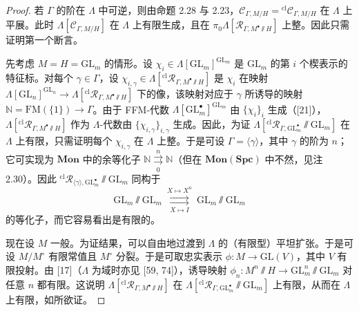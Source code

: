 \begin{proof}
若 $\Gamma$ 的阶在 $\Lambda$ 中可逆，则由命题 2.28 与 2.23，$\mathcal C_{\Gamma,M/H} = {}^{\mathrm{cl}}\mathcal C_{\Gamma,M/H}$ 在 $\Lambda$ 上平展。此时 $\Lambda[\mathcal C_{\Gamma,M/H}]$ 在 $\Lambda$ 上有限生成，且在 $\pi_0\Lambda[\mathcal R_{\Gamma,M^\bullet\sslash H}]$ 上整。因此只需证明第一个断言。

先考虑 $M = H = \mathrm{GL}_m$ 的情形。设 $\chi_i \in \Lambda[\mathrm{GL}_m]^{\mathrm{GL}_m}$ 是 $\mathrm{GL}_m$ 的第 $i$ 个楔表示的特征标。对每个 $\gamma \in \Gamma$，设 $\chi_{i,\gamma} \in \Lambda[{}^{\mathrm{cl}}\mathcal R_{\Gamma,M^\bullet\sslash H}]$ 是 $\chi_i$ 在映射 $\Lambda[\mathrm{GL}_n]^{\mathrm{GL}_n} \to \Lambda[{}^{\mathrm{cl}}\mathcal R_{\Gamma,M^\bullet\sslash H}]$ 下的像，该映射对应于 $\gamma$ 所诱导的映射 $\mathbb N = \mathrm{FM}(\{1\}) \to \Gamma$。由于 FFM-代数 $\Lambda[\mathrm{GL}^\bullet_m]^{\mathrm{GL}_m}$ 由 $\{\chi_i\}_i$ 生成（[21]），$\Lambda[{}^{\mathrm{cl}}\mathcal R_{\Gamma,M^\bullet\sslash H}]$ 作为 $\Lambda$-代数由 $\{\chi_{i,\gamma}\}_{i,\gamma}$ 生成。因此，为证 $\Lambda[{}^{\mathrm{cl}}\mathcal R_{\Gamma,\mathrm{GL}^\bullet_m}\sslash \mathrm{GL}_m]$ 在 $\Lambda$ 上有限，只需证明每个 $\chi_{i,\gamma}$ 在 $\Lambda$ 上整。于是可设 $\Gamma = \langle\gamma\rangle$，其中 $\gamma$ 的阶为 $n$；它可实现为 $\mathbf{Mon}$ 中的余等化子 $\mathbb N \overset{n}{\underset{0}{\rightrightarrows}} \mathbb N$（但在 $\mathbf{Mon}(\mathbf{Spc})$ 中不然，见注 2.30）。因此 ${}^{\mathrm{cl}}\mathcal R_{\langle\gamma\rangle,\mathrm{GL}^\bullet_m}\sslash \mathrm{GL}_m$ 同构于
\[
\mathrm{GL}_m\sslash\mathrm{GL}_m\ \underset{X\mapsto I}{\overset{X\mapsto X^n}{\rightrightarrows}}\ \mathrm{GL}_m\sslash\mathrm{GL}_m
\]
的等化子，而它容易看出是有限的。

现在设 $M$ 一般。为证结果，可以自由地过渡到 $\Lambda$ 的（有限型）平坦扩张。于是可设 $M/M^\circ$ 有限常值且 $M^\circ$ 分裂。于是可取忠实表示 $\phi\colon M \to \mathrm{GL}(V)$，其中 $V$ 有限投射。由 [17]（$\Lambda$ 为域时亦见 [59, 74]），诱导映射 $\phi_n\colon M^n\sslash H \to \mathrm{GL}^n_m\sslash \mathrm{GL}_m$ 对任意 $n$ 都有限。这说明 $\Lambda[{}^{\mathrm{cl}}\mathcal R_{\Gamma,M^\bullet\sslash H}]$ 在 $\Lambda[{}^{\mathrm{cl}}\mathcal R_{\Gamma,\mathrm{GL}^\bullet_m}\sslash \mathrm{GL}_m]$ 上有限，从而在 $\Lambda$ 上有限，如所欲证。
\end{proof}

